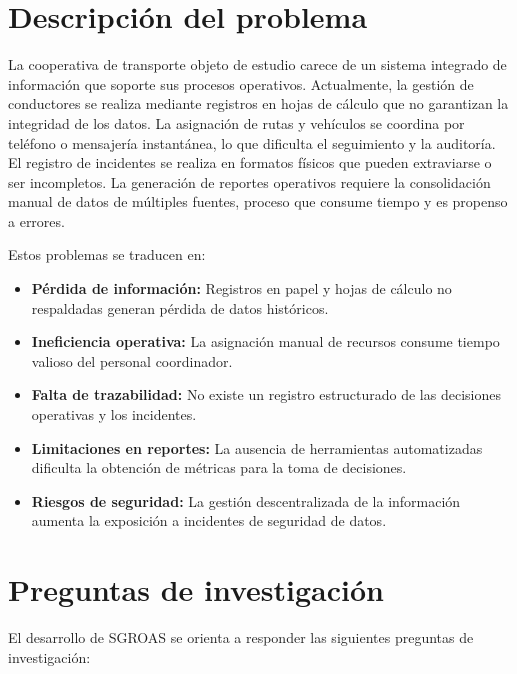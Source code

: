 \section{Descripción del problema}
\label{sec:problema}

La cooperativa de transporte objeto de estudio carece de un sistema integrado de información que soporte sus procesos operativos. Actualmente, la gestión de conductores se realiza mediante registros en hojas de cálculo que no garantizan la integridad de los datos. La asignación de rutas y vehículos se coordina por teléfono o mensajería instantánea, lo que dificulta el seguimiento y la auditoría. El registro de incidentes se realiza en formatos físicos que pueden extraviarse o ser incompletos. La generación de reportes operativos requiere la consolidación manual de datos de múltiples fuentes, proceso que consume tiempo y es propenso a errores.

Estos problemas se traducen en:
\begin{itemize}
  \item \textbf{Pérdida de información:} Registros en papel y hojas de cálculo no respaldadas generan pérdida de datos históricos.
  \item \textbf{Ineficiencia operativa:} La asignación manual de recursos consume tiempo valioso del personal coordinador.
  \item \textbf{Falta de trazabilidad:} No existe un registro estructurado de las decisiones operativas y los incidentes.
  \item \textbf{Limitaciones en reportes:} La ausencia de herramientas automatizadas dificulta la obtención de métricas para la toma de decisiones.
  \item \textbf{Riesgos de seguridad:} La gestión descentralizada de la información aumenta la exposición a incidentes de seguridad de datos.
\end{itemize}

\section{Preguntas de investigación}
\label{sec:preguntas}

El desarrollo de SGROAS se orienta a responder las siguientes preguntas de investigación:

